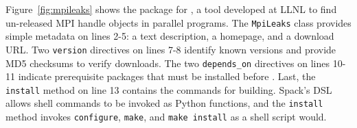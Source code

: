 Figure~\ref{fig:mpileaks} shows the package for \mpileaks, a tool developed
at LLNL to find un-released MPI handle objects in parallel programs.
The {\tt MpiLeaks} class provides simple metadata on lines 2-5: a text
description, a homepage, and a download URL.
Two {\tt version} directives on lines 7-8 identify known versions and provide
MD5 checksums to verify downloads.
The two {\tt depends\_on} directives on lines 10-11 indicate prerequisite
packages that must be installed before \mpileaks.
Last, the {\tt install} method on line 13 contains the commands for building.
Spack's DSL allows shell commands to be invoked as Python functions,
and the {\tt install} method invokes {\tt configure},
{\tt make}, and {\tt make install} as a shell script would.
